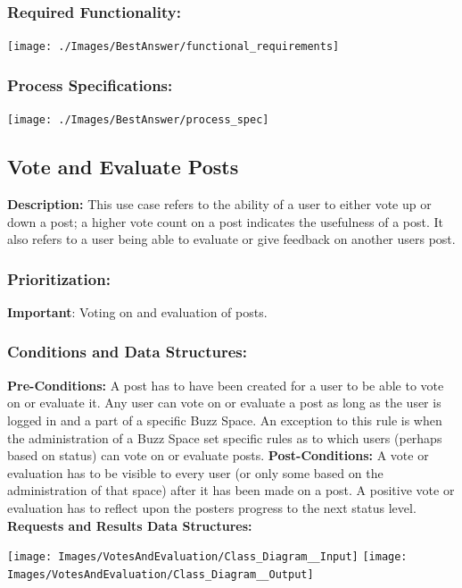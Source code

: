 \documentclass[a4paper,11pt]{article}
\begin{document}
\subsubsection{Required Functionality:} 
\begin{center}
\texttt{[image: ./Images/BestAnswer/functional\_requirements]}
\end{center}
\subsubsection{Process Specifications:} 
\begin{center}
\texttt{[image: ./Images/BestAnswer/process\_spec]}
\end{center}

\subsection{Vote and Evaluate Posts}
\textbf{Description:}
This use case refers to the ability of a user to either vote up or down a post; a higher vote count on a post indicates the usefulness of a post. It also refers to a user being able to evaluate or give feedback on another users post.
\subsubsection{Prioritization:} 
\textbf{Important}: Voting on and evaluation of posts.
\subsubsection{Conditions and Data Structures:}
\textbf{Pre-Conditions:}
A post has to have been created for a user to be able to vote on or evaluate it. Any user can vote on or evaluate a post as long as the user is logged in and a part of a specific Buzz Space. An exception to this rule is when the administration of a Buzz Space set specific rules as to which users (perhaps based on status) can vote on or evaluate posts.
\textbf{Post-Conditions:}
A vote or evaluation has to be visible to every user (or only some based on the administration of that space) after it has been made on a post. A positive vote or evaluation has to reflect upon the posters progress to the next status level.
\textbf{Requests and Results Data Structures:}
\begin{center}
\texttt{[image: Images/VotesAndEvaluation/Class\_Diagram\_\_Input]}
\texttt{[image: Images/VotesAndEvaluation/Class\_Diagram\_\_Output]}
\end{center}
\end{document}
